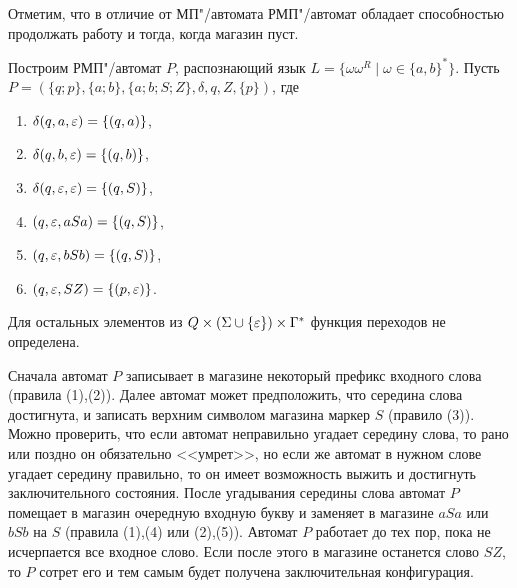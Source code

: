 Отметим, что в отличие от МП"/автомата РМП"/автомат обладает способностью продолжать работу и тогда, когда магазин пуст.

\begin{myexample}
\label{example-langwwr-rmp}
Построим РМП"/автомат $P$, распознающий язык $L=\{\omega\omega^R\mid \omega\in\{a,b\}^*\}$. Пусть $P=(\{q;p\},\{a;b\},\{a;b;S;Z\},\delta,q,Z,\{p\})$, где
\begin{multicols}{2}
\begin{enumerate}
\item $\delta(q,a,\varepsilon) = \{(q,a)\}$,
\item $\delta(q,b,\varepsilon) = \{(q,b)\}$,
\item $\delta(q,\varepsilon,\varepsilon) = \{(q,S)\}$,
\item $(q,\varepsilon,aSa) = \{(q,S)\}$,
\item $(q,\varepsilon,bSb) = \{(q,S)\}$,
\item $(q,\varepsilon,SZ) = \{(p,\varepsilon)\}$.
\end{enumerate}
\end{multicols}
\noindent Для остальных элементов из $Q\times(\Sigma\cup\{\varepsilon\})\times\Gamma^*$ функция переходов не определена.

Сначала автомат $P$ записывает в магазине некоторый префикс входного слова (правила (1),(2)). Далее автомат может предположить, что середина слова достигнута, и записать верхним символом магазина маркер $S$ (правило (3)). Можно проверить, что если автомат неправильно угадает середину слова, то рано или поздно он обязательно <<умрет>>, но если же автомат в нужном слове угадает середину правильно, то он имеет возможность выжить и достигнуть заключительного состояния. После угадывания середины слова автомат $P$ помещает в магазин очередную входную букву и заменяет в магазине $aSa$ или $bSb$ на $S$ (правила (1),(4) или (2),(5)). Автомат $P$ работает до тех пор, пока не исчерпается все входное слово. Если после этого в магазине останется слово $SZ$, то $P$ сотрет его и тем самым будет получена заключительная конфигурация.


\end{myexample}

